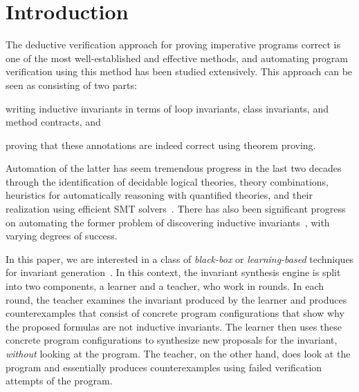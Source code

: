 
\section{Introduction}
\label{sec:intro}

The deductive verification approach for proving imperative programs correct is one of the most well-established and effective methods, and automating program verification using this method has been studied extensively. This approach can be seen as consisting of two parts:
\begin{enumerate*}[label={(\alph*)}]
    \item writing inductive invariants in terms of loop invariants, class invariants, and method contracts, and
    \item proving that these annotations are indeed correct using theorem proving.
\end{enumerate*} 
Automation of the latter has seem tremendous progress in the last two decades through the identification of decidable logical theories, theory combinations, heuristics for automatically reasoning with quantified theories, and their realization using efficient SMT solvers~\cite{DBLP:conf/cav/BarrettCDHJKRT11,DBLP:conf/tacas/MouraB08}.
There has also been significant progress on automating the former problem of discovering inductive invariants~\cite{DBLP:conf/pldi/BallMMR01,DBLP:conf/vmcai/Bradley11,DBLP:conf/tacas/ChampionC0S18,DBLP:conf/cav/ColonSS03,DBLP:conf/popl/CousotC77,DBLP:conf/oopsla/DilligDLM13,DBLP:conf/icse/ErnstCGN00,DBLP:journals/pacmpl/EzudheenND0M18,DBLP:conf/fm/FlanaganL01,DBLP:conf/fmcad/FedyukovichKB17,DBLP:conf/cav/0001LMN13,DBLP:conf/cav/0001LMN14,DBLP:conf/pldi/GulwaniSV08,DBLP:conf/cav/GuptaR09,DBLP:journals/corr/KrishnaPW15,DBLP:conf/cav/McMillan03,DBLP:conf/cav/0001A14,DBLP:conf/esop/0001GHALN13,DBLP:conf/sas/0001GHAN13,DBLP:conf/cav/SharmaNA12,DBLP:conf/pldi/ZhuMJ18}, with varying degrees of success. 

In this paper, we are interested in a class of \emph{black-box} or \emph{learning-based} techniques for invariant generation~\cite{DBLP:conf/tacas/ChampionC0S18,DBLP:journals/pacmpl/EzudheenND0M18,DBLP:conf/cav/0001LMN14,DBLP:conf/pldi/ZhuMJ18}. In this context, the invariant synthesis engine is split into two components, a learner and a teacher, who work in rounds. In each round, the teacher examines the invariant produced by the learner and produces counterexamples that consist of concrete program configurations that show why the proposed formulas are not inductive invariants. The learner then uses these concrete program configurations to synthesize new proposals for the invariant, \emph{without} looking at the program. The teacher, on the other hand, does look at the program and essentially produces counterexamples using failed verification attempts of the program.

